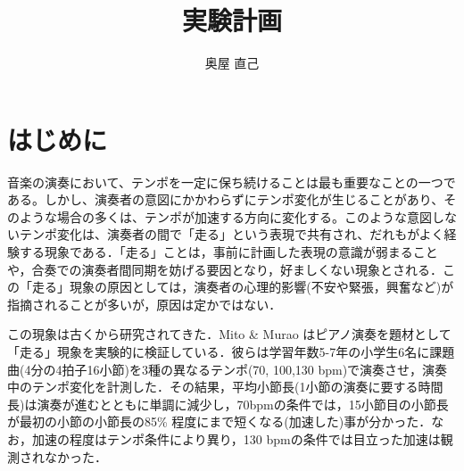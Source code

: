 \documentclass[twocolumn,10pt]{jarticle}
\title{実験計画}
\author{奥屋 直己}
\begin{document}
\maketitle

\section{はじめに}
音楽の演奏において、テンポを一定に保ち続けることは最も重要なことの一つである。しかし、演奏者の意図にかかわらずにテンポ変化が生じることがあり、そのような場合の多くは、テンポが加速する方向に変化する。このような意図しないテンポ変化は、演奏者の間で「走る」という表現で共有され、だれもがよく経験する現象である．「走る」ことは，事前に計画した表現の意識が弱まることや，合奏での演奏者間同期を妨げる要因となり，好ましくない現象とされる．この「走る」現象の原因としては，演奏者の心理的影響(不安や緊張，興奮など)が指摘されることが多いが，原因は定かではない．

この現象は古くから研究されてきた．Mito \& Murao \cite{Mito}はピアノ演奏を題材として「走る」現象を実験的に検証している．彼らは学習年数5-7年の小学生6名に課題曲(4分の4拍子16小節)を3種の異なるテンポ(70, 100,130 bpm)で演奏させ，演奏中のテンポ変化を計測した．その結果，平均小節長(1小節の演奏に要する時間長)は演奏が進むとともに単調に減少し，70bpmの条件では，15小節目の小節長が最初の小節の小節長の85\% 程度にまで短くなる(加速した)事が分かった．なお，加速の程度はテンポ条件により異り，130 bpmの条件では目立った加速は観測されなかった．
\end{document}
